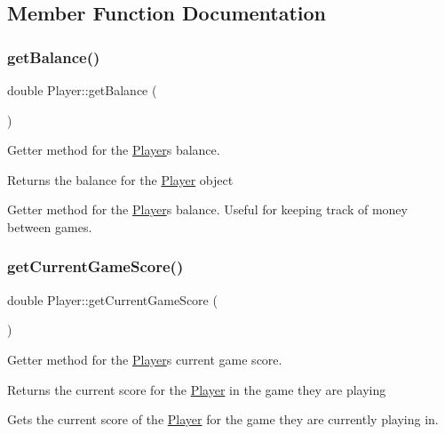 \subsection{Member Function Documentation}
\mbox{\label{class_player_a0e9f70886f4a7544422931103e59ea26}} 
\subsubsection{\texorpdfstring{get\+Balance()}{getBalance()}}
{\footnotesize\ttfamily double Player\+::get\+Balance (\begin{DoxyParamCaption}{ }\end{DoxyParamCaption})}



Getter method for the \mbox{\hyperlink{class_player}{Player}}\textquotesingle{}s balance. 

\begin{DoxyReturn}{Returns}
the balance for the \mbox{\hyperlink{class_player}{Player}} object
\end{DoxyReturn}
Getter method for the \mbox{\hyperlink{class_player}{Player}}\textquotesingle{}s balance. Useful for keeping track of money between games. \mbox{\label{class_player_a0aade73735727e68e4f07734e76c875a}} 
\subsubsection{\texorpdfstring{get\+Current\+Game\+Score()}{getCurrentGameScore()}}
{\footnotesize\ttfamily double Player\+::get\+Current\+Game\+Score (\begin{DoxyParamCaption}{ }\end{DoxyParamCaption})}



Getter method for the \mbox{\hyperlink{class_player}{Player}}\textquotesingle{}s current game score. 

\begin{DoxyReturn}{Returns}
the current score for the \mbox{\hyperlink{class_player}{Player}} in the game they are playing
\end{DoxyReturn}
Gets the current score of the \mbox{\hyperlink{class_player}{Player}} for the game they are currently playing in. \mbox{\label{class_player_a5117d4863ff28cd0bf522cfe34995c27}} 
